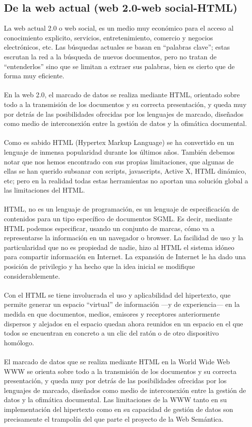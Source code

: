 \documentclass[conference]{IEEEtran}
\begin{document}
\subsection{De la web actual (web 2.0-web social-HTML)}
   La web actual 2.0 o web social, es un medio muy económico para el acceso al conocimiento explicito, servicios, entretenimiento, comercio y negocios electrónicos, etc. Las búsquedas actuales se basan en “palabras clave”; estas escrutan la red a la búsqueda de nuevos documentos, pero no tratan de “entenderlos” sino que se limitan a extraer sus palabras, bien es cierto que de forma muy eficiente. \\ \\
   En la web 2.0, el marcado de datos se realiza mediante HTML, orientado sobre todo a la transmisión de los documentos y su correcta presentación, y queda muy por detrás de las posibilidades ofrecidas por los lenguajes de marcado, diseñados como medio de interconexión entre la gestión de datos y la ofimática documental. \\ \\
   Como es sabido HTML (Hypertex Markup Language) se ha convertido en un lenguaje de inmensa popularidad durante los últimos años. También debemos notar que nos hemos encontrado con sus propias limitaciones, que algunas de ellas se han querido subsanar con scripts, javascripts, Active X, HTML dinámico, etc; pero en la realidad todas estas herramientas no aportan una solución global a las limitaciones del HTML. \\ \\
   HTML, no es un lenguaje de programación, es un lenguaje de especificación de contenidos para un tipo específico de documentos SGML. Es decir, mediante HTML podemos especificar, usando un conjunto de marcas, cómo va a representarse la información en un navegador o browser. La facilidad de uso y la particularidad que no es propiedad de nadie, hizo al HTML el sistema idóneo para compartir información en Internet. La expansión de Internet le ha dado una posición de privilegio y ha hecho que la idea inicial se modifique considerablemente.\\ \\
   Con el HTML se tiene involucrada el uso y aplicabilidad del hipertexto, que permite generar un espacio “virtual” de información —y de experiencia— en la medida en que documentos, medios, emisores y receptores anteriormente dispersos y alejados en el espacio quedan ahora reunidos en un espacio en el que todos se encuentran en concreto a un clic del ratón o de otro dispositivo homólogo. \\ \\
   El marcado de datos que se realiza mediante HTML en la World Wide Web WWW se orienta sobre todo a la transmisión de los documentos y su correcta presentación, y queda muy por detrás de las posibilidades ofrecidas por los lenguajes de marcado, diseñados como medio de interconexión entre la gestión de datos y la ofimática documental. Las limitaciones de la WWW tanto en su implementación del hipertexto como en su capacidad de gestión de datos son precisamente el trampolín del que parte el proyecto de la Web Semántica.
   
\end{document}
